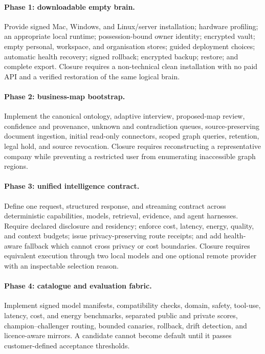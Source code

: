 \paragraph{Phase 1: downloadable empty brain.}
Provide signed Mac, Windows, and Linux/server installation; hardware profiling;
an appropriate local runtime; possession-bound owner identity; encrypted vault;
empty personal, workspace, and organisation stores; guided deployment choices;
automatic health recovery; signed rollback; encrypted backup; restore; and
complete export.  Closure requires a non-technical clean installation with no
paid API and a verified restoration of the same logical brain.

\paragraph{Phase 2: business-map bootstrap.}
Implement the canonical ontology, adaptive interview, proposed-map review,
confidence and provenance, unknown and contradiction queues, source-preserving
document ingestion, initial read-only connectors, scoped graph queries,
retention, legal hold, and source revocation.  Closure requires reconstructing
a representative company while preventing a restricted user from enumerating
inaccessible graph regions.

\paragraph{Phase 3: unified intelligence contract.}
Define one request, structured response, and streaming contract across
deterministic capabilities, models, retrieval, evidence, and agent harnesses.
Require declared disclosure and residency; enforce cost, latency, energy,
quality, and context budgets; issue privacy-preserving route receipts; and add
health-aware fallback which cannot cross privacy or cost boundaries.  Closure
requires equivalent execution through two local models and one optional remote
provider with an inspectable selection reason.

\paragraph{Phase 4: catalogue and evaluation fabric.}
Implement signed model manifests, compatibility checks, domain, safety,
tool-use, latency, cost, and energy benchmarks, separated public and private
scores, champion--challenger routing, bounded canaries, rollback, drift
detection, and licence-aware mirrors.  A candidate cannot become default until
it passes customer-defined acceptance thresholds.

